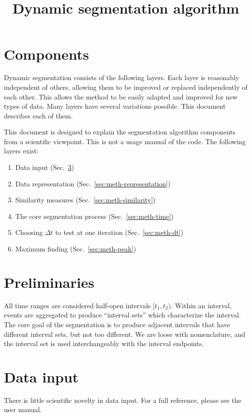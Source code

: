 \documentclass[draft]{article}
\title{Dynamic segmentation algorithm}
\begin{document}
\maketitle

\section{Components}

Dynamic segmentation consists of the following layers.  Each layer is
reasonably independent of others, allowing them to be improved or
replaced independently of each other.  This allows the method
to be easily adapted and improved for new types of data.
Many layers have several variations possible.  This document
describes each of them.

This document is designed to explain the segmentation algorithm
components from a scientific viewpoint.  This is not a usage manual of
the code.  The following layers exist:

\begin{enumerate}
\item Data input (Sec.~\ref{sec:meth-input})
\item Data representation (Sec.~\ref{sec:meth-representation})
\item Similarity measures (Sec.~\ref{sec:meth-similarity})
\item The core segmentation process (Sec.~\ref{sec:meth-time})
\item Choosing $\Delta t$ to test at one iteration (Sec.~\ref{sec:meth-dt})
\item Maximum finding (Sec.~\ref{sec:meth-peak})
\end{enumerate}

\section{Preliminaries}
\label{sec:meth-prelim}
All time ranges are considered half-open intervals $[t_1, t_2)$.
Within an interval, events are aggregated to produce ``interval sets''
which characterize the interval.  The core goal of the segmentation is
to produce adjacent intervals that have different interval sets, but
not too different.  We are loose with nomenclature, and
the interval set is used interchangeably with the interval endpoints.



\section{Data input}
\label{sec:meth-input}
There is little scientific novelty in data input.  For a full
reference, please see the user manual.
\end{document}
